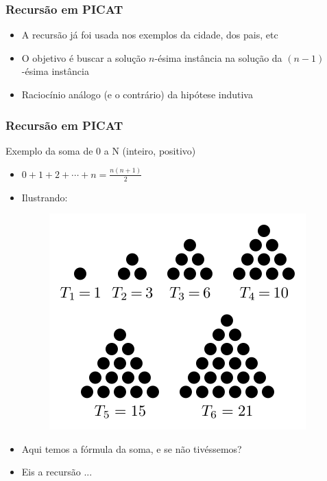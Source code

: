 \documentclass[10pt]{beamer}
\begin{document}
\begin{frame}%
 \frametitle{Recursão em PICAT}

\begin{block}{}

\begin{itemize}
  \item A recursão já foi usada nos exemplos da cidade, dos pais, etc
  \pause
  
  \item O objetivo é buscar a solução $n$-ésima instância na solução da $(n-1)$-ésima   instância
  \pause
  
  \item Raciocínio análogo (e o contrário) da hipótese indutiva
  
  
\end{itemize}

\end{block}

\end{frame}
\begin{frame}%
 \frametitle{Recursão em PICAT}

\begin{block}{Exemplo da soma de 0 a N (inteiro, positivo)}
\begin{itemize}
  
  \item $0 + 1 + 2 + \cdots + n = \frac{n(n + 1)}{2}$
  \pause
  
  \item Ilustrando:
  
   \pause
  
  \begin{figure}[!ht]
\centering
\includegraphics[width=.3\textwidth]{figures/six_triangular_numbers.png}
\end{figure}
  
  \item Aqui temos a fórmula da soma, e se não tivéssemos?
  \pause
   
  \item Eis a recursão ...
  
\end{itemize}



\end{block}

\end{frame}
\end{document}
